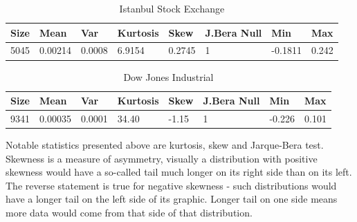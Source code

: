 \begin{table}[!h]
\caption{Istanbul Stock Exchange}
\vspace{0.3cm}
\begin{tabular}{|l|l|l|l|l|l|l|l|}
\hline
Size & Mean & Var & Kurtosis & Skew & J.Bera Null & Min & Max \\
\hline
5045 & 0.00214 & 0.0008 &     6.9154 &     0.2745 &  1 & -0.1811 & 0.242 \\
\hline
\end{tabular}
\end{table}

\vspace{0.3cm}

\begin{table}[!h]
\caption{Dow Jones Industrial}
\vspace{0.3cm}
\begin{tabular}{|l|l|l|l|l|l|l|l|}
\hline
Size & Mean & Var & Kurtosis & Skew & J.Bera Null & Min & Max \\
\hline
9341 & 0.00035 & 0.0001 &    34.40 &    -1.15 &     1 &    -0.226 & 0.101 \\
\hline
\end{tabular}
\end{table}

Notable statistics presented above are kurtosis, skew and Jarque-Bera
test. Skewness is a measure of asymmetry, visually a distribution with positive
skewness would have a so-called tail much longer on its right side than on its
left. The reverse statement is true for negative skewness - such distributions
would have a longer tail on the left side of its graphic. Longer tail on one
side means more data would come from that side of that distribution.

\begin{figure}[!h]
\vspace{0.6cm}
\end{figure}

